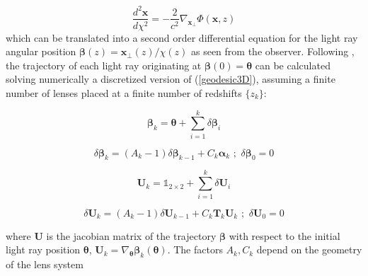 \documentclass[reprint,aps,prd,superscriptaddress,showkeys,showpacs]{revtex4-1}
\newcommand{\bb}[1]{\mathbf{#1}}
\begin{document}
\begin{equation}
\label{geodesic3D}
\frac{d^2\bb{x}}{d\chi^2} = -\frac{2}{c^2}\nabla_\bb{x_\perp}\Phi(\bb{x},z)
\end{equation}
%
which can be translated into a second order differential equation for the light ray angular position $\pmb{\beta}(z)=\bb{x}_\perp(z)/\chi(z)$ as seen from the observer. Following \citep{RayTracingHartlap}, the trajectory of each light ray originating at $\pmb{\beta}(0)=\pmb{\theta}$ can be calculated solving numerically a discretized version of (\ref{geodesic3D}), assuming a finite number of lenses placed at a finite number of redshifts $\{z_k\}$:
%

\begin{widetext}

\begin{equation}
\label{geodesic2D}
\pmb{\beta}_{k} = \pmb{\theta} + \sum_{i=1}^k\delta\pmb{\beta}_i 
\end{equation}

\begin{equation}
\label{deflections}
\delta\pmb{\beta}_k = (A_k-1)\delta\pmb{\beta}_{k-1} + C_k\pmb{\alpha}_k \,\, ; \,\, \delta\pmb{\beta}_0=0
\end{equation}

\begin{equation}
\bb{U}_{k} = \mathds{1}_{2\times2} + \sum_{i=1}^k\delta\bb{U}_i 
\end{equation}

\begin{equation}
\label{sheartensorproduct}
\delta\bb{U}_k = (A_k-1)\delta\bb{U}_{k-1} + C_k\bb{T}_k\bb{U}_k \,\, ; \,\, \delta\bb{U}_0=0
\end{equation}

\end{widetext}
%
where $\bb{U}$ is the jacobian matrix of the trajectory $\pmb{\beta}$ with respect to the initial light ray position $\pmb{\theta}$, $\bb{U}_k=\nabla_{\pmb{\theta}}\pmb{\beta}_k(\pmb{\theta})$. The factors $A_k,C_k$ depend on the geometry of the lens system
\end{document}
